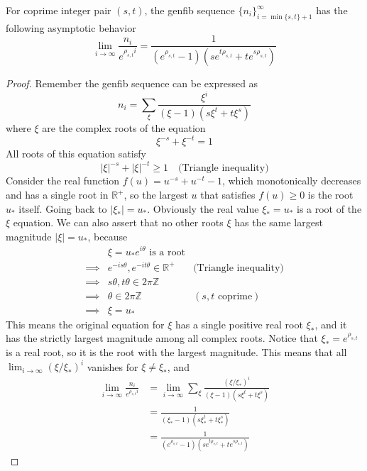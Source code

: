 \documentclass[]{article}
\begin{document}
\vspace{1cm}
\begin{lemma}
	For coprime integer pair $(s, t)$, the genfib sequence $\{n_i\}_{i=\min\{s,t\}+1}^{\infty}$ has the following asymptotic behavior
	\[
	\lim_{i\to\infty}    \frac{n_i}{e^{\rho_{s,t} i}} = \frac{1}{( e^{\rho_{s,t}} - 1)(s e^{t\rho_{s,t}} + t e^{s\rho_{s,t}})}
	\]
\end{lemma}
\begin{proof}
	Remember the genfib sequence can be expressed as
	\[
	n_i = \sum_{\xi} \frac{\xi^i}{(\xi - 1)(s \xi^t + t \xi^s)}
	\]
	where $\xi$ are the complex roots of the equation
	\[
	\xi^{-s} + \xi^{-t} = 1
	\]
	All roots of this equation satisfy
	\[
	|\xi|^{-s} + |\xi|^{-t} \ge 1 \quad \text{(Triangle inequality)}
	\]
	Consider the real function $f(u) = u^{-s} + u^{-t} - 1$, which monotonically decreases and has a single root in $\mathbb{R}^+$, so the largest $u$ that satisfies $f(u)\ge 0$ is the root $u_*$ itself. Going back to $|\xi_*| = u_*$. Obviously the real value $\xi_* = u_*$ is a root of the $\xi$ equation. We can also assert that no other roots $\xi$ has the same largest magnitude  $|\xi| = u_*$, because
	\begin{align*}
	&\xi = u_*e^{i\theta} \text{ is a root} \\
	\implies& e^{-i s\theta}, e^{-i t\theta} \in \mathbb{R}^+ \quad &\text{(Triangle inequality)} \\
	\implies& s\theta, t\theta \in 2\pi\mathbb{Z} \\
	\implies& \theta \in 2\pi\mathbb{Z} \quad &(s, t \text{ coprime})\\
	\implies& \xi = u_*
	\end{align*}
	This means the original equation for $\xi$ has a single positive real root $\xi_*$, and it has the strictly largest magnitude among all complex roots. Notice that $\xi_* = e^{\rho_{s,t}}$ is a real root, so it is the root with the largest magnitude. This means that all $\lim_{i\to\infty} (\xi/\xi_*)^i$ vanishes for $\xi\ne\xi_*$, and
	\begin{align*}
	\lim_{i\to\infty}    \frac{n_i}{e^{\rho_{s,t} i}} &= \lim_{i\to\infty} \sum_{\xi} \frac{(\xi / \xi_*)^i}{(\xi - 1)(s \xi^t + t \xi^s)} \\
	&=\frac{1}{(\xi_* - 1)(s \xi_*^t + t \xi_*^s)} \\
	&=\frac{1}{( e^{\rho_{s,t}} - 1)(s e^{t\rho_{s,t}} + t e^{s\rho_{s,t}})}
	\end{align*}

\end{proof}
\end{document}

